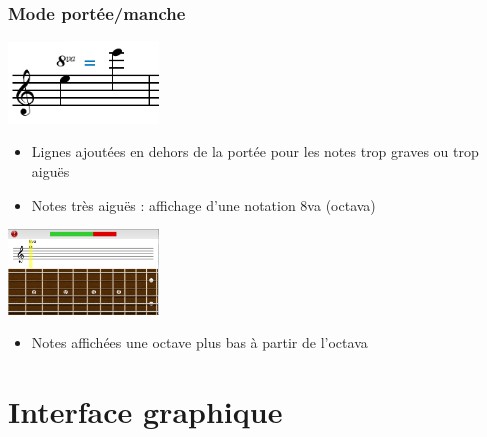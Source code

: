 \documentclass{beamer}
\begin{document}
		\begin{frame}
		 \frametitle{Mode portée/manche}
                         
                         
                         \begin{minipage}{0.35\linewidth}
                                 \includegraphics[width=4cm]{images/octava.png}
                         \end{minipage}\hfill
                         \begin{minipage}{0.6\linewidth}
 
                                 \begin{itemize}
					 \item Lignes ajoutées en dehors de la portée pour les notes trop graves ou trop aiguës
                                         \item Notes très aiguës : affichage d'une notation 8va (octava)
                                 \end{itemize}
                         \end{minipage}
\bigbreak
                         \begin{minipage}{0.35\linewidth}
                                 \includegraphics[width=4cm]{images/portee_octava.png}
                         \end{minipage}\hfill
                         \begin{minipage}{0.6\linewidth}
 
                                 \begin{itemize}
                                         \item Notes affichées une octave plus bas à partir de l'octava
                                 \end{itemize}
                         \end{minipage}
		\end{frame}
	
\section{Interface graphique}
\end{document}
